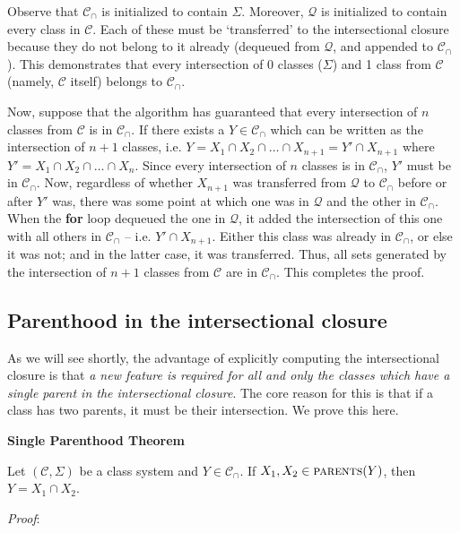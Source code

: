 \documentclass[11pt, oneside]{article}   	%
\begin{document}
Observe that $\mathcal C_\cap$ is initialized to contain $\Sigma$. Moreover, $\mathcal Q$ is initialized to contain every class in $\mathcal C$. Each of these must be `transferred' to the intersectional closure because they do not belong to it already (dequeued from $\mathcal Q$, and appended to $\mathcal C_\cap$). This demonstrates that every intersection of 0 classes ($\Sigma$) and 1 class from $\mathcal C$ (namely, $\mathcal C$ itself) belongs to $\mathcal C_\cap$.

Now, suppose that the algorithm has guaranteed that every intersection of $n$ classes from $\mathcal C$ is in $\mathcal C_\cap$. If there exists a $Y \in \mathcal C_\cap$ which can be written as the intersection of $n+1$ classes, i.e. $Y = X_1 \cap X_2 \cap \ldots \cap X_{n+1} = Y' \cap X_{n+1}$ where $Y' = X_1 \cap X_2 \cap \ldots \cap X_n$. Since every intersection of $n$ classes is in $\mathcal C_\cap$, $Y'$ must be in $\mathcal C_\cap$. Now, regardless of whether $X_{n+1}$ was transferred from $\mathcal Q$ to $\mathcal C_\cap$ before or after $Y'$ was, there was some point at which one was in $\mathcal Q$ and the other in $\mathcal C_\cap$. When the \textbf{for} loop dequeued the one in $\mathcal Q$, it added the intersection of this one with all others in $\mathcal C_\cap$ -- i.e. $Y' \cap X_{n+1}$. Either this class was already in $\mathcal C_\cap$, or else it was not; and in the latter case, it was transferred. Thus, all sets generated by the intersection of $n+1$ classes from $\mathcal C$ are in $\mathcal C_\cap$. This completes the proof.


\subsection{Parenthood in the intersectional closure}

As we will see shortly, the advantage of explicitly computing the intersectional closure is that \textit{a new feature is required for all and only the classes which have a single parent in the intersectional closure}. The core reason for this is that if a class has two parents, it must be their intersection. We prove this here.

\vspace{\baselineskip} \noindent \textbf{Single Parenthood Theorem}

Let $(\mathcal C, \Sigma)$ be a class system and $Y \in \mathcal C_\cap$. If $X_1, X_2 \in \textsc{parents}(Y)$, then $Y = X_1 \cap X_2$.

\vspace{\baselineskip} \noindent \textit{Proof}:
\end{document}
